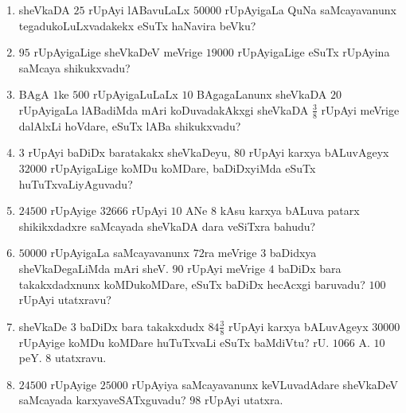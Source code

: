 \begin{enumerate}[\rm (1)]
\item sheVkaDA $25$ rUpAyi lABavuLaLx $50000$ rUpAyigaLa QuNa saMcayavanunx tegadukoLuLxvadakekx eSuTx haNavira beVku?

\item $95$ rUpAyigaLige sheVkaDeV meVrige $19000$ rUpAyigaLige eSuTx rUpAyina saMcaya shikukxvadu?

\item BAgA $1$ke $500$ rUpAyigaLuLaLx $10$ BAgagaLanunx sheVkaDA $20$ rUpAyigaLa lABadiMda mAri koDuvadakAkxgi sheVkaDA $\tfrac{3}{8}$ rUpAyi meVrige dalAlxLi hoVdare, eSuTx lABa shikukxvadu?

\item $3$ rUpAyi baDiDx baratakakx sheVkaDeyu, $80$ rUpAyi karxya bALuvAgeyx $32000$ rUpAyigaLige koMDu koMDare, baDiDxyiMda eSuTx huTuTxvaLiyAguvadu?

\item $24500$ rUpAyige $32666$ rUpAyi $10$ ANe $8$ kAsu karxya bALuva patarx shikikxdadxre saMcayada sheVkaDA dara veSiTxra bahudu?

\item $50000$ rUpAyigaLa saMcayavanunx $72$ra meVrige $3$ baDidxya sheVkaDegaLiMda mAri sheV. $90$ rUpAyi meVrige $4$ baDiDx bara takakxdadxnunx koMDukoMDare, eSuTx baDiDx hecAcxgi baruvadu? $100$ rUpAyi utatxravu?

\item sheVkaDe $3$ baDiDx bara takakxdudx $84\tfrac{3}{8}$ rUpAyi karxya bALuvAgeyx $30000$ rUpAyige koMDu koMDare huTuTxvaLi eSuTx baMdiVtu?
\hfill rU. $1066$ A. $10$ peY. $8$ utatxravu.

\item $24500$ rUpAyige $25000$ rUpAyiya saMcayavanunx keVLuvadAdare sheVkaDeV saMcayada karxyaveSATxguvadu? $98$ rUpAyi utatxra.
\end{enumerate}
